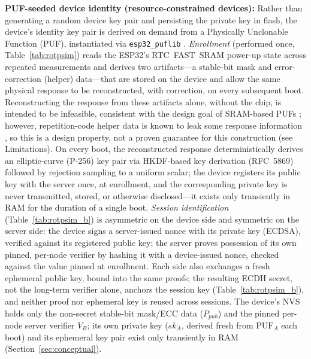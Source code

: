 \documentclass[preprint,12pt,authoryear]{elsarticle}
\begin{document}
\textbf{PUF-seeded device identity (resource-constrained devices):} Rather than generating a random device key pair and persisting the private key in flash, the device's identity key pair is derived on demand from a Physically Unclonable Function (PUF), instantiated via \texttt{esp32\_puflib} \citep{stanicek2022esp32puflib}. \emph{Enrollment} (performed once, Table~\ref{tab:rotpsim}) reads the ESP32's RTC~FAST~SRAM power-up state across repeated measurements and derives two artifacts---a stable-bit mask and error-correction (helper) data---that are stored on the device and allow the same physical response to be reconstructed, with correction, on every subsequent boot. Reconstructing the response from these artifacts alone, without the chip, is intended to be infeasible, consistent with the design goal of SRAM-based PUFs \citep{guajardo2007fpga}; however, repetition-code helper data is known to leak some response information \citep{dodis2004fuzzy, maes2013physically, delvaux2015helper}, so this is a design property, not a proven guarantee for this construction (see Limitations). On every boot, the reconstructed response deterministically derives an elliptic-curve (P-256) key pair via HKDF-based key derivation (RFC~5869) followed by rejection sampling to a uniform scalar; the device registers its public key with the server once, at enrollment, and the corresponding private key is never transmitted, stored, or otherwise disclosed---it exists only transiently in RAM for the duration of a single boot. \emph{Session identification} (Table~\ref{tab:rotpsim_b}) is asymmetric on the device side and symmetric on the server side: the device signs a server-issued nonce with its private key (ECDSA), verified against its registered public key; the server proves possession of its own pinned, per-node verifier by hashing it with a device-issued nonce, checked against the value pinned at enrollment. Each side also exchanges a fresh ephemeral public key, bound into the same proofs; the resulting ECDH secret, not the long-term verifier alone, anchors the session key (Table~\ref{tab:rotpsim_b}), and neither proof nor ephemeral key is reused across sessions. The device's NVS holds only the non-secret stable-bit mask/ECC data ($P_{pub}$) and the pinned per-node server verifier $V_B$; its own private key ($sk_A$, derived fresh from $\text{PUF}_A$ each boot) and its ephemeral key pair exist only transiently in RAM (Section~\ref{sec:conceptual}).
\end{document}
